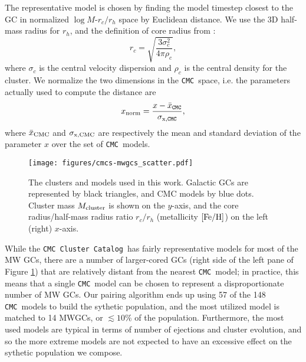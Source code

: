 \documentclass[twocolumn]{aastex631}
\newcommand{\CMC}{\texttt{CMC}}
\newcommand{\CMCcat}{\texttt{CMC Cluster Catalog}}
\begin{document}
The representative model is chosen by finding the model timestep closest to the GC in normalized $\log M$-$r_c / r_h$ space by Euclidean distance.
We use the 3D half-mass radius for $r_h$, and the definition of core radius from \citet{1987degc.book.....S}:
\begin{equation}
    r_c = \sqrt{\frac{3 \sigma_c^2}{4 \pi \rho_c}},
\end{equation}
where $\sigma_c$ is the central velocity dispersion and $\rho_c$ is the central density for the cluster.
We normalize the two dimensions in the \CMC\ space, i.e. the parameters actually used to compute the distance are
\begin{equation}
    x_{\rm norm} = \frac{x - \bar{x}_{\rm \CMC}}{\sigma_{\rm x, \CMC}},
\end{equation}
where $\bar{x}_{\rm CMC}$ and $\sigma_{\rm x,CMC}$ are respectively the mean and standard deviation of the parameter $x$ over the set of \CMC\ models.

\begin{figure}
    \begin{centering}
        \texttt{[image: figures/cmcs-mwgcs\_scatter.pdf]}
        \caption{
        The clusters and models used in this work.
        Galactic GCs are represented by black triangles, and CMC models by blue dots.
        Cluster mass $M_{\rm cluster}$ is shown on the $y$-axis, and the core radius/half-mass radius ratio $r_c/r_h$ (metallicity $[{\rm Fe/H}]$) on the left (right) $x$-axis.
        }
        \label{fig:cmcs-mwgcs_scatter}
    \end{centering}
\end{figure}

While the \CMCcat\ has fairly representative models for most of the MW GCs, there are a number of larger-cored GCs (right side of the left pane of Figure \ref{fig:cmcs-mwgcs_scatter}) that are relatively distant from the nearest \CMC\ model; in practice, this means that a single \CMC\ model can be chosen to represent a disproportionate number of MW GCs.
Our pairing algorithm ends up using 57 of the 148 \CMC\ models to build the sythetic population, and the most utilized model is matched to 14 MWGCs, or $\lesssim10\%$ of the population.
Furthermore, the most used models are typical in terms of number of ejections and cluster evolution, and so the more extreme models are not expected to have an excessive effect on the sythetic population we compose.
\end{document}
